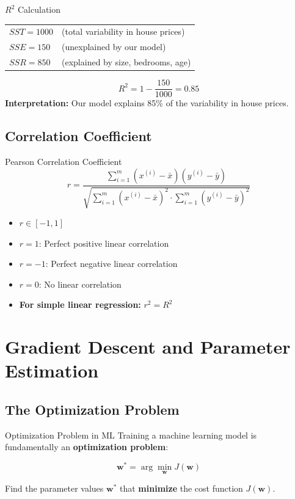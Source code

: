 \documentclass[12pt,a4paper]{report}
\begin{document}
\begin{examplebox}{$R^2$ Calculation}
\begin{tabular}{ll}
$SST = 1000$ & (total variability in house prices) \\
$SSE = 150$ & (unexplained by our model) \\
$SSR = 850$ & (explained by size, bedrooms, age) \\
\end{tabular}
\[
R^2 = 1 - \frac{150}{1000} = 0.85
\]
\textbf{Interpretation:} Our model explains 85\% of the variability in house prices.
\end{examplebox}

\section{Correlation Coefficient}

\begin{formulabox}{Pearson Correlation Coefficient}
\[
r = \frac{\sum_{i=1}^{m}(x^{(i)} - \bar{x})(y^{(i)} - \bar{y})}{\sqrt{\sum_{i=1}^m (x^{(i)}-\bar{x})^2 \cdot \sum_{i=1}^m (y^{(i)}-\bar{y})^2}}
\]
\begin{itemize}[noitemsep]
  \item $r \in [-1, 1]$
  \item $r = 1$: Perfect positive linear correlation
  \item $r = -1$: Perfect negative linear correlation
  \item $r = 0$: No linear correlation
  \item \textbf{For simple linear regression:} $r^2 = R^2$
\end{itemize}
\end{formulabox}

\chapter{Gradient Descent and Parameter Estimation}

\section{The Optimization Problem}

\begin{defbox}{Optimization Problem in ML}
Training a machine learning model is fundamentally an \textbf{optimization problem}:

\[
\mathbf{w}^* = \arg\min_{\mathbf{w}} J(\mathbf{w})
\]

Find the parameter values $\mathbf{w}^*$ that \textbf{minimize} the cost function $J(\mathbf{w})$.
\end{defbox}
\end{document}
